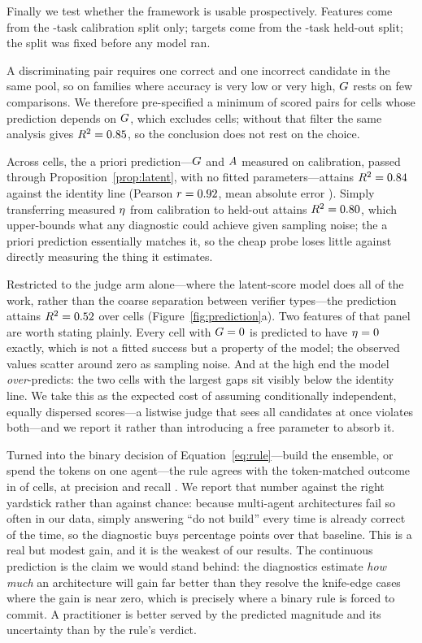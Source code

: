 Finally we test whether the framework is usable prospectively. Features come
from the \nCalib{}-task calibration split only; targets come from the
\nTest{}-task held-out split; the split was fixed before any model ran.

A discriminating pair requires one correct and one incorrect candidate in the
same pool, so on families where accuracy is very low or very high, $G$ rests
on few comparisons. We therefore pre-specified a minimum of \minPairs{} scored
pairs for cells whose prediction depends on $G$, which excludes
\nDroppedLowPairs{} cells; without that filter the same analysis gives
$R^2 = 0.85{}$, so the conclusion does not rest on the choice.

Across \nPredCells{} cells, the a priori prediction---$G$ and $A$
measured on calibration, passed through Proposition~\ref{prop:latent}, with no
fitted parameters---attains $R^2 = 0.84{}$ against the identity line
(Pearson $r = 0.92{}$, mean absolute error \maeApriori{}). Simply transferring measured $\eta$ from calibration to held-out attains
$R^2 = 0.80{}$, which upper-bounds what any diagnostic could achieve
given sampling noise; the a priori prediction essentially matches it, so the
cheap probe loses little against directly measuring the thing it estimates.

Restricted to the judge arm alone---where the latent-score model does all of
the work, rather than the coarse separation between verifier types---the
prediction attains $R^2 = 0.52{}$ over \nJudgeArmCells{} cells
(Figure~\ref{fig:prediction}a). Two features of that panel are worth stating
plainly. Every cell with $G=0$ is predicted to have $\eta=0$ exactly, which
is not a fitted success but a property of the model; the observed values
scatter around zero as sampling noise. And at the high end the model
\emph{over}-predicts: the two cells with the largest gaps sit visibly below
the identity line. We take this as the expected cost of assuming
conditionally independent, equally dispersed scores---a listwise judge that
sees all candidates at once violates both---and we report it rather than
introducing a free parameter to absorb it.

Turned into the binary decision of Equation~\eqref{eq:rule}---build the ensemble,
or spend the tokens on one agent---the rule agrees with the token-matched
outcome in \decisionAgreement{} of \nDecisionCells{} cells, at precision
\decisionPrecision{} and recall \decisionRecall{}. We report that number
against the right yardstick rather than against chance: because multi-agent
architectures fail so often in our data, simply answering ``do not build'' every
time is already correct \decisionBaseline{} of the time, so the diagnostic buys
\decisionLift{} percentage points over that baseline. This is a real but modest
gain, and it is the weakest of our results. The continuous prediction is the
claim we would stand behind: the diagnostics estimate \emph{how much} an
architecture will gain far better than they resolve the knife-edge cases where
the gain is near zero, which is precisely where a binary rule is forced to
commit. A practitioner is better served by the predicted magnitude and its
uncertainty than by the rule's verdict.

